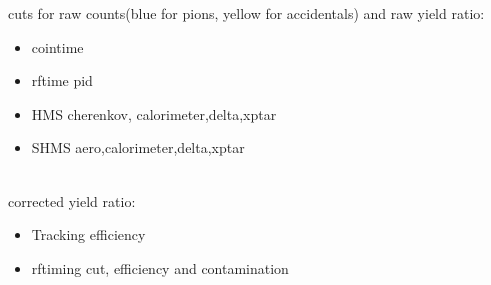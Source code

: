 \documentclass[aspectratio=169,xcolor=dvipsnames]{beamer}
\begin{document}
\begin{frame}{}
cuts for raw counts(blue for pions, yellow for accidentals) and raw yield ratio: 
    \begin{itemize}
        \item cointime
        \item rftime pid
        \item HMS cherenkov, calorimeter,delta,xptar
        \item SHMS aero,calorimeter,delta,xptar
    \end{itemize}
\\
corrected yield ratio:
\begin{itemize}
    \item Tracking efficiency
    \item rftiming cut, efficiency and contamination
\end{itemize}
\end{frame}

\end{document}
